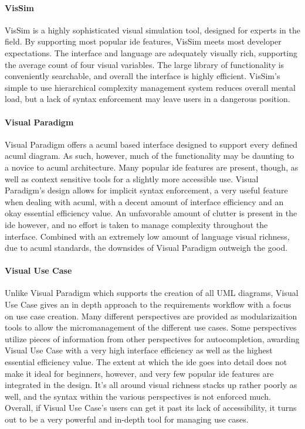 \paragraph{VisSim} VisSim is a highly sophisticated visual simulation tool,
designed for experts in the field. By supporting most popular \ac{ide}
features, VisSim meets most developer expectations. The interface and
language are adequately visually rich, supporting the average count of four
visual variables. The large library of functionality is conveniently
searchable, and overall the interface is highly efficient. VisSim's simple
to use hierarchical complexity management system reduces overall mental
load, but a lack of syntax enforcement may leave users in a dangerous
position.

\paragraph{Visual Paradigm} Visual Paradigm offers a ac{uml} based interface
designed to support every defined ac{uml} diagram. As such, however, much of
the functionality may be daunting to a novice to ac{uml} architecture. Many
popular \ac{ide} features are present, though, as well as context sensitive
tools for a slightly more accessible use. Visual Paradigm's design allows
for implicit syntax enforcement, a very useful feature when dealing with
ac{uml}, with a decent amount of interface efficiency and an okay essential
efficiency value. An unfavorable amount of clutter is present in the
\ac{ide} however, and no effort is taken to manage complexity throughout
the interface. Combined with an extremely low amount of language visual
richness, due to ac{uml} standards, the downsides of Visual Paradigm outweigh
the good.

\paragraph{Visual Use Case} Unlike Visual Paradigm which supports the creation of all UML diagrams, Visual Use Case gives an in depth approach to the requirements workflow with a focus on use case creation. Many different perspectives are provided as modularizaition tools to allow the micromanagement of the different use cases. Some perspectives utilize pieces of information from other perspectives for autocompletion, awarding Visual Use Case with a very high interface efficiency as well as the highest essential efficiency value. The extent at which the \ac{ide} goes into detail does not make it ideal for beginners, however, and very few popular \ac{ide} features are integrated in the design. It's all around visual richness stacks up rather poorly as well, and the syntax within the various perspectives is not enforced much. Overall, if Visual Use Case's users can get it past its lack of accessibility, it turns out to be a very powerful and in-depth tool for managing use cases.

